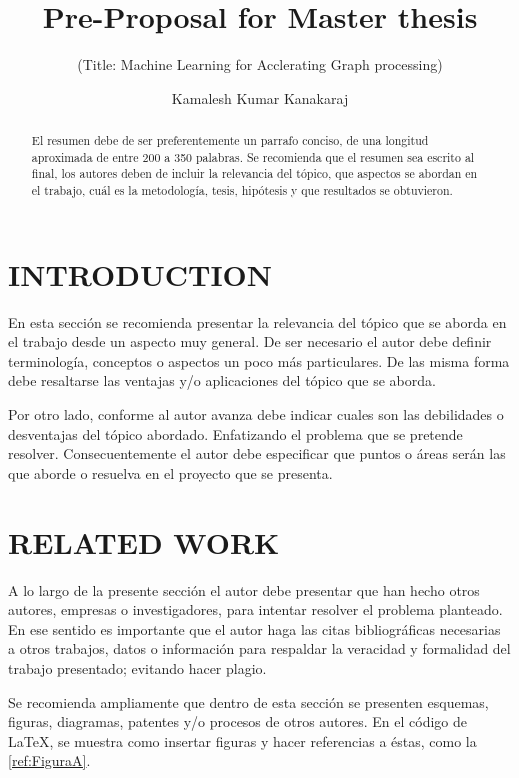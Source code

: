 \documentclass[twocolumns]{IEEEtran}
\title{Pre-Proposal for Master thesis}
\author[1]{Kamalesh Kumar Kanakaraj}
\affil[1]{Department of Computer Science, ETH Zurich MSc Data Science  Autumn Semester 2018 Applicant}
\subtitle{(Title: Machine Learning for Acclerating Graph processing)}
\begin{document}
\maketitle %
\begin{abstract}
El resumen debe de ser preferentemente un parrafo conciso, de una longitud aproximada de entre 200 a 350 palabras. Se recomienda que el resumen sea escrito al final, los autores deben de incluir la relevancia del tópico, que aspectos se abordan en el trabajo, cuál es la metodología, tesis, hipótesis y que resultados se obtuvieron.
\end{abstract}
\section{INTRODUCTION}
En esta sección se recomienda presentar la relevancia del tópico que se aborda en el trabajo desde un aspecto muy general. De ser necesario el autor debe definir terminología, conceptos o aspectos un poco más particulares. De las misma forma debe resaltarse las ventajas y/o aplicaciones del tópico que se aborda.

Por otro lado, conforme al autor avanza debe indicar cuales son las debilidades o desventajas del tópico abordado. Enfatizando el problema que se pretende resolver. Consecuentemente el autor debe especificar que puntos o áreas serán las que aborde o resuelva en el proyecto que se presenta.

\section{RELATED WORK}

A lo largo de la presente sección el autor debe presentar que han hecho otros autores, empresas o investigadores, para intentar resolver el problema planteado. En ese sentido es importante que el autor haga las citas bibliográficas necesarias a otros trabajos, datos o información para respaldar la veracidad y formalidad del trabajo presentado; evitando hacer plagio\cite{Chavez-Campos2016}\cite{pascual199012}.

Se recomienda ampliamente que dentro de esta sección se presenten esquemas, figuras, diagramas, patentes y/o procesos de otros autores. En el código de \LaTeX{}, se muestra como insertar figuras y hacer referencias a éstas, como la \figurename{} \ref{ref:FiguraA}. 
\end{document}
